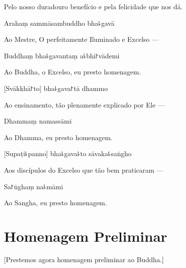 \begin{english}
Pelo nosso duradouro benefício e pela felicidade que nos dá.
\end{english}

\clearpage

Arahaṃ sammāsambuddho bha꜕gavā

\begin{english}
Ao Mestre, O perfeitamente Iluminado e Excelso ---
\end{english}

Buddhaṃ bha꜕gavantaṃ a꜕bhi꜓vādemi

\begin{english}
  Ao Buddha, o Excelso, eu presto homenagem.
\end{english}

[Svākkhā꜓to] bha꜕gava꜓tā dhammo

\begin{english}
 Ao ensinamento, tão plenamente explicado por Ele ---
\end{english}

Dhammaṃ namassāmi

\begin{english}
  Ao Dhamma, eu presto homenagem.
\end{english}

[Supaṭi꜕panno] bha꜕gava꜕to sāvaka꜕saṅgho

\begin{english}
Aos discípulos do Excelso que tão bem praticaram ---
\end{english}

Sa꜓ṅghaṃ na꜕māmi

\begin{english}
  Ao Sangha, eu presto homenagem.
\end{english}

\chapter{Homenagem Preliminar}

\begin{leader}
\end{leader}

\begin{english}
  [Prestemos agora homenagem preliminar ao Buddha.]
\end{english}

\vspace{\baselineskip}

